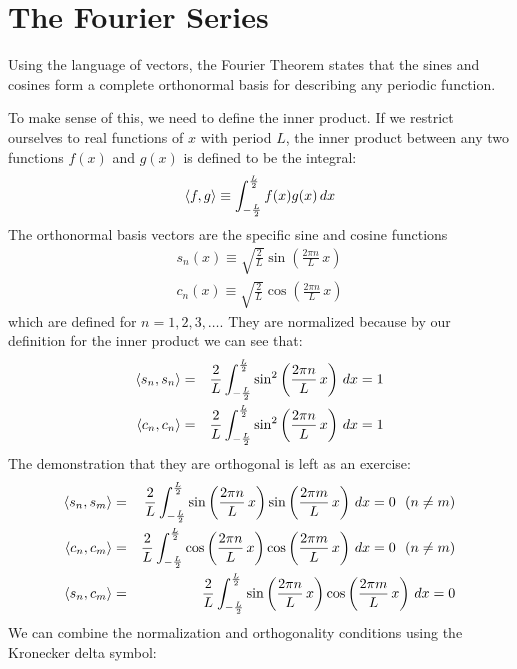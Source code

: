 \documentclass[12pt]{article}
\begin{document}
 
\section{The Fourier Series}

Using the language of vectors, the Fourier Theorem states that the sines and cosines form a complete orthonormal basis for describing any periodic function.  

To make sense of this, we need to define the inner product. If we restrict ourselves to real functions of $x$ with period $L$, the inner product between any two functions $f(x)$ and $g(x)$ is defined to be the integral:
\begin{equation*}
\braket{f, g} \equiv \int_{-\frac{L}{2}}^{\frac{L}{2}} f(x) g(x) \, dx
\end{equation*}
The orthonormal basis vectors are the specific sine and cosine functions
\begin{eqnarray*}
s_n(x) \equiv \sqrt{\frac{2}{L}}\sin\left(\frac{2\pi n}{L} \, x \right)\\
c_n(x) \equiv \sqrt{\frac{2}{L}}\cos\left(\frac{2\pi n}{L} \, x \right)
\end{eqnarray*}
which are defined for $n=1,2,3,\ldots$.  They are normalized because by our definition for the inner product we can see that:
\begin{eqnarray*}
\braket{s_n, s_n} &=& \frac{2}{L} \int_{-\frac{L}{2}}^{\frac{L}{2}} \sin^2\left(\frac{2\pi n}{L} \, x \right) \, dx = 1 \\
\braket{c_n, c_n} &=& \frac{2}{L} \int_{-\frac{L}{2}}^{\frac{L}{2}} \sin^2\left(\frac{2\pi n}{L} \, x \right) \, dx = 1
\end{eqnarray*}
The demonstration that they are orthogonal is left as an exercise:
\begin{eqnarray}
\braket{s_n, s_m} &=& \frac{2}{L} \int_{-\frac{L}{2}}^{\frac{L}{2}} 
\sin\left(\frac{2\pi n}{L} \, x \right) \sin\left(\frac{2\pi m}{L} \, x \right) \, dx = 0 ~~(n \neq m) \label{eqn:trigortha} \\
\braket{c_n, c_m} &=& \frac{2}{L} \int_{-\frac{L}{2}}^{\frac{L}{2}} 
\cos\left(\frac{2\pi n}{L} \, x \right) \cos\left(\frac{2\pi m}{L} \, x \right) \, dx = 0~~(n \neq m) \label{eqn:trigorthb}\\
\braket{s_n, c_m} &=& \frac{2}{L} \int_{-\frac{L}{2}}^{\frac{L}{2}} 
\sin\left(\frac{2\pi n}{L} \, x \right) \cos\left(\frac{2\pi m}{L} \, x \right) \, dx = 0 \label{eqn:trigorthc}
\end{eqnarray}
We can combine the normalization and orthogonality conditions using the Kronecker delta symbol:
\end{document}
